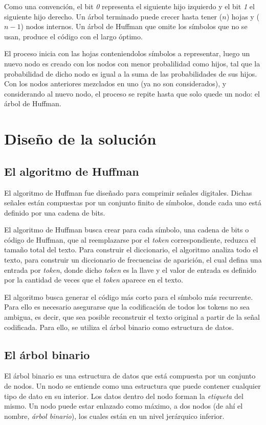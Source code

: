 \documentclass{IEEEtran}
\begin{document}
Como una convenci\'on, el bit \emph{0} representa el siguiente hijo izquierdo y el bit \emph{1} el siguiente hijo derecho. Un \'arbol terminado puede crecer hasta tener ($n$) hojas y ($n - 1$) nodos internos. Un \'arbol de Huffman que omite los s\'imbolos que no se usan, produce el c\'odigo con el largo \'optimo.

El proceso inicia con las hojas conteniendolos s\'imbolos a representar, luego un nuevo nodo es creado con los nodos con menor probalilidad como hijos, tal que la probabilidad de dicho nodo es igual a la suma de las probabilidades de sus hijos. Con los nodos anteriores mezclados en uno (ya no son considerados), y considerando al nuevo nodo, el proceso se repite hasta que solo quede un nodo: el \'arbol de Huffman.
\section{Dise\~no de la soluci\'on}
\subsection{El algoritmo de Huffman}
El algoritmo de Huffman fue dise\~nado para comprimir se\~nales digitales. Dichas se\~nales est\'an compuestas por un conjunto finito de s\'imbolos, donde cada uno est\'a definido por una cadena de bits.

El algoritmo de Huffman busca crear para cada s\'imbolo, una cadena de bits o c\'odigo de Huffman, que al reemplazarse por el \emph{token} correspondiente, reduzca el tama\~no total del texto. Para construir el diccionario, el algoritmo analiza todo el texto, para construir un diccionario de frecuencias de aparici\'on, el cual defina una entrada por \emph{token}, donde dicho \emph{token} es la llave y el valor de entrada es definido por la cantidad de veces que el \emph{token} aparece en el texto.

El algoritmo busca generar el c\'odigo m\'as corto para el s\'imbolo m\'as recurrente. Para ello es necesario asegurarse que la codificaci\'on de todos los tokens no sea ambigua, es decir, que sea posible reconstruir el texto original a partir de la se\~nal codificada. Para ello, se utiliza el \'arbol binario como estructura de datos.

\subsection{El \'arbol binario}
El \'arbol binario es una estructura de datos que est\'a compuesta por un conjunto de nodos. Un nodo se entiende como una estructura que puede contener cualquier tipo de dato en su interior. Los datos dentro del nodo forman la \emph{etiqueta} del mismo. Un nodo puede estar enlazado como m\'aximo, a dos nodos (de ah\'i el nombre, \emph{\'arbol binario}), los cuales est\'an en un nivel jer\'arquico inferior.
\end{document}
